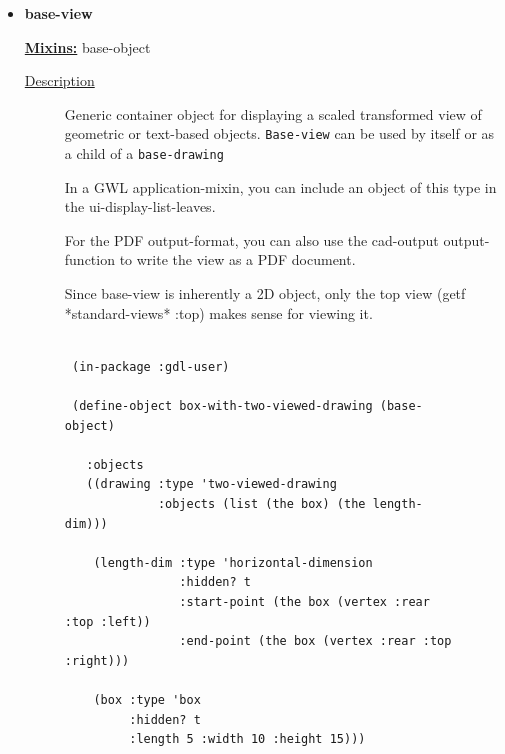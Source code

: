 \documentclass [11pt]{book}
\begin{document}
\begin{itemize}
\begin{description}
\end{description}







\item {}
\label{prim:base-view}
\textbf{base-view}


\textbf{
\underline{Mixins:}} base-object





\begin{description}

\item [
\underline{Description}]


Generic container object for displaying a scaled transformed view of geometric or 
text-based objects. \texttt{Base-view} can be used by itself or as a child of a \texttt{base-drawing}

In a GWL application-mixin, you can include an object of this type in the ui-display-list-leaves.

For the PDF output-format, you can also use the cad-output output-function to write the 
view as a PDF document. 

Since base-view is inherently a 2D object, only the top view (getf *standard-views* :top) 
makes sense for viewing it.



\end{description}




\begin{figure}
\begin{lrbox}{\boxedverb}
\begin{minipage}{\linewidth}
{\small

\begin{verbatim}
                 
 (in-package :gdl-user)

 (define-object box-with-two-viewed-drawing (base-object)
  
   :objects
   ((drawing :type 'two-viewed-drawing
             :objects (list (the box) (the length-dim)))
    
    (length-dim :type 'horizontal-dimension
                :hidden? t
                :start-point (the box (vertex :rear :top :left))
                :end-point (the box (vertex :rear :top :right)))
   
    (box :type 'box
         :hidden? t
         :length 5 :width 10 :height 15)))


\end{verbatim}}
\end{minipage}
\end{lrbox}
\end{figure}
\end{itemize}
\end{document}
